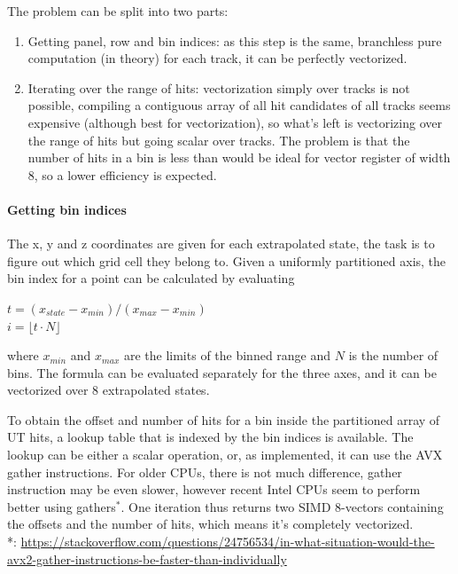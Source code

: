 \documentclass[12pt]{article}
\newcommand\tab[1][.7cm]{\hspace*{#1}}
\begin{document}
The problem can be split into two parts:
\begin{enumerate}
	\item Getting panel, row and bin indices: as this step is the same, branchless pure computation (in theory) for each track, it can be perfectly vectorized.
	\item Iterating over the range of hits: vectorization simply over tracks is not possible, compiling a contiguous array of all hit candidates of all tracks seems expensive (although best for vectorization), so what's left is vectorizing over the range of hits but going scalar over tracks. The problem is that the number of hits in a bin is less than would be ideal for vector register of width 8, so a lower efficiency is expected.
\end{enumerate}


\paragraph{Getting bin indices} \mbox{}\vspace{0.4pc}

The x, y and z coordinates are given for each extrapolated state, the task is to figure out which grid cell they belong to. Given a uniformly partitioned axis, the bin index for a point can be calculated by evaluating
\begin{center}
	$t = (x_{state} - x_{min})/(x_{max} - x_{min})$\\
	$i =  \lfloor t \cdot N \rfloor$	
\end{center}
where $x_{min}$ and $x_{max}$ are the limits of the binned range and $N$ is the number of bins. The formula can be evaluated separately for the three axes, and it can be vectorized over 8 extrapolated states.

To obtain the offset and number of hits for a bin inside the partitioned array of UT hits, a lookup table that is indexed by the bin indices is available. The lookup can be either a scalar operation, or, as implemented, it can use the AVX gather instructions. For older CPUs, there is not much difference, gather instruction may be even slower, however recent Intel CPUs seem to perform better using gathers$^*$. One iteration thus returns two SIMD 8-vectors containing the offsets and the number of hits, which means it's completely vectorized.
\\
{
	\tiny
	\tab *: \url{https://stackoverflow.com/questions/24756534/in-what-situation-would-the-avx2-gather-instructions-be-faster-than-individually}
}
\end{document}
